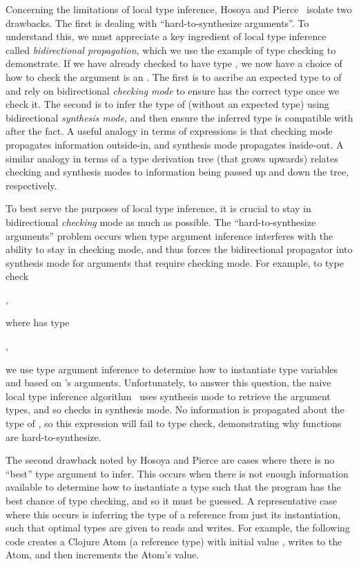 Concerning the limitations of local type inference,
Hosoya and Pierce~\cite{hosoya1999good}
isolate two drawbacks.
The first is dealing with ``hard-to-synthesize arguments''.
To understand this, we must appreciate a key ingredient of local type inference
called \emph{bidirectional propagation}, which 
we use the example of type checking  to demonstrate.
If we have already checked  to have type , we
now have a choice of how to check the argument  is an .
The first is to ascribe an expected type to  of 
and rely on
bidirectional \emph{checking mode} to ensure  has the correct type
once we check it.
The second is to infer the type of  (without an expected type) using 
bidirectional \emph{synthesis mode}, and then ensure the inferred type
is compatible with  after the fact.
A useful analogy in terms of expressions is that checking mode propagates
information outside-in, and synthesis mode propagates inside-out.
A similar analogy in terms of a type derivation tree (that grows upwards)
relates checking and synthesis modes to information being passed
up and down the tree, respectively.

To best serve the purposes of local type inference, it is crucial to stay in
bidirectional \emph{checking} mode as much as possible.
The ``hard-to-synthesize arguments'' problem occurs when type argument
inference interferes with the ability to stay in checking mode, and
thus forces the bidirectional propagator into synthesis mode
for arguments that require checking mode.
For example, to type check

,

where  has type

,

we use type argument inference to determine how to instantiate type variables 
and  based on 's arguments.
Unfortunately, 
to answer this question,
the naive local type inference algorithm~\cite{PierceLTI}
uses synthesis mode to retrieve the argument types,
and so checks  in synthesis mode.
No information is propagated about the type of ,
so this expression will fail to type check, demonstrating
why functions are hard-to-synthesize.

The second drawback noted by Hosoya and Pierce are
cases where there is no ``best'' type argument to infer.
This occurs when there is not enough information available
to determine how to instantiate a type such that the program
has the best chance of type checking, and so it must be guessed.
A representative case where this occurs is inferring the
type of a reference from just its instantiation, such
that optimal types are given to reads and writes.
For example, the following code creates a Clojure Atom
(a reference type) with initial value , writes
 to the Atom, and then increments the Atom's value.

